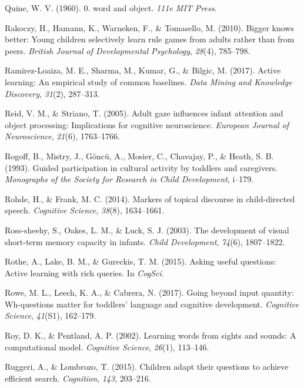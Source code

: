 \documentclass[oneside]{report}
\begin{document}
\hypertarget{ref-quine19600}{}
Quine, W. V. (1960). 0. word and object. \emph{111e MIT Press}.

\hypertarget{ref-rakoczy2010bigger}{}
Rakoczy, H., Hamann, K., Warneken, F., \& Tomasello, M. (2010). Bigger
knows better: Young children selectively learn rule games from adults
rather than from peers. \emph{British Journal of Developmental
Psychology}, \emph{28}(4), 785--798.

\hypertarget{ref-ramirez2017active}{}
Ramirez-Loaiza, M. E., Sharma, M., Kumar, G., \& Bilgic, M. (2017).
Active learning: An empirical study of common baselines. \emph{Data
Mining and Knowledge Discovery}, \emph{31}(2), 287--313.

\hypertarget{ref-reid2005adult}{}
Reid, V. M., \& Striano, T. (2005). Adult gaze influences infant
attention and object processing: Implications for cognitive
neuroscience. \emph{European Journal of Neuroscience}, \emph{21}(6),
1763--1766.

\hypertarget{ref-rogoff1993guided}{}
Rogoff, B., Mistry, J., Göncü, A., Mosier, C., Chavajay, P., \& Heath,
S. B. (1993). Guided participation in cultural activity by toddlers and
caregivers. \emph{Monographs of the Society for Research in Child
Development}, i--179.

\hypertarget{ref-rohde2014markers}{}
Rohde, H., \& Frank, M. C. (2014). Markers of topical discourse in
child-directed speech. \emph{Cognitive Science}, \emph{38}(8),
1634--1661.

\hypertarget{ref-ross2003development}{}
Ross-sheehy, S., Oakes, L. M., \& Luck, S. J. (2003). The development of
visual short-term memory capacity in infants. \emph{Child Development},
\emph{74}(6), 1807--1822.

\hypertarget{ref-rothe2015asking}{}
Rothe, A., Lake, B. M., \& Gureckis, T. M. (2015). Asking useful
questions: Active learning with rich queries. In \emph{CogSci}.

\hypertarget{ref-rowe2017going}{}
Rowe, M. L., Leech, K. A., \& Cabrera, N. (2017). Going beyond input
quantity: Wh-questions matter for toddlers' language and cognitive
development. \emph{Cognitive Science}, \emph{41}(S1), 162--179.

\hypertarget{ref-roy2002learning}{}
Roy, D. K., \& Pentland, A. P. (2002). Learning words from sights and
sounds: A computational model. \emph{Cognitive Science}, \emph{26}(1),
113--146.

\hypertarget{ref-ruggeri2015children}{}
Ruggeri, A., \& Lombrozo, T. (2015). Children adapt their questions to
achieve efficient search. \emph{Cognition}, \emph{143}, 203--216.
\end{document}
